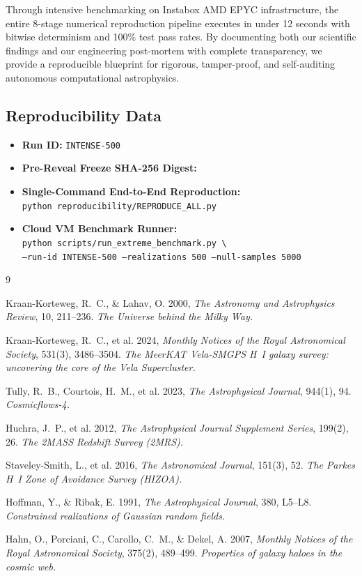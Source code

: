 \documentclass[11pt,a4paper]{article}
\begin{document}
Through intensive benchmarking on Instabox AMD EPYC infrastructure, the entire 8-stage numerical reproduction pipeline executes in under 12 seconds with bitwise determinism and 100\% test pass rates. By documenting both our scientific findings and our engineering post-mortem with complete transparency, we provide a reproducible blueprint for rigorous, tamper-proof, and self-auditing autonomous computational astrophysics.

\subsection*{Reproducibility Data}
\begin{itemize}
    \item \textbf{Run ID:} \texttt{INTENSE-500}
    \item \textbf{Pre-Reveal Freeze SHA-256 Digest:} \\
    \item \textbf{Single-Command End-to-End Reproduction:} \\
    \texttt{python reproducibility/REPRODUCE\_ALL.py}
    \item \textbf{Cloud VM Benchmark Runner:} \\
    \texttt{python scripts/run\_extreme\_benchmark.py \textbackslash} \\
    \hspace*{1.5em}\texttt{--run-id INTENSE-500 --realizations 500 --null-samples 5000}
\end{itemize}

\begin{thebibliography}{9}

Kraan-Korteweg, R.~C., \& Lahav, O. 2000,
\textit{The Astronomy and Astrophysics Review}, 10, 211--236.
\textit{The Universe behind the Milky Way.}

Kraan-Korteweg, R.~C., et al. 2024,
\textit{Monthly Notices of the Royal Astronomical Society}, 531(3), 3486--3504.
\textit{The MeerKAT Vela-SMGPS H~I galaxy survey: uncovering the core of the Vela Supercluster.}

Tully, R.~B., Courtois, H.~M., et al. 2023,
\textit{The Astrophysical Journal}, 944(1), 94.
\textit{Cosmicflows-4.}

Huchra, J.~P., et al. 2012,
\textit{The Astrophysical Journal Supplement Series}, 199(2), 26.
\textit{The 2MASS Redshift Survey (2MRS).}

Staveley-Smith, L., et al. 2016,
\textit{The Astronomical Journal}, 151(3), 52.
\textit{The Parkes H~I Zone of Avoidance Survey (HIZOA).}

Hoffman, Y., \& Ribak, E. 1991,
\textit{The Astrophysical Journal}, 380, L5--L8.
\textit{Constrained realizations of Gaussian random fields.}

Hahn, O., Porciani, C., Carollo, C.~M., \& Dekel, A. 2007,
\textit{Monthly Notices of the Royal Astronomical Society}, 375(2), 489--499.
\textit{Properties of galaxy haloes in the cosmic web.}

\end{thebibliography}
\end{document}
